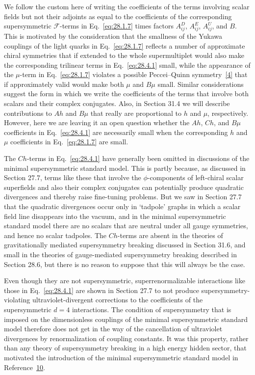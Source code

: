 We follow the custom here of writing the coefficients of the terms
involving scalar fields but not their adjoints as equal to the
coefficients of the corresponding supersymmetric \(\mathcal{F}\)-terms in
Eq.~\eqref{eq:28.1.7} times factors \(A_{ij}^{D}\), \(A_{ij}^{E}\),
\(A_{ij}^{U}\), and \(B\). This is motivated by the consideration that
the smallness of the Yukawa couplings of the light quarks in
Eq.~\eqref{eq:28.1.7} reflects a number of approximate chiral symmetries
that if extended to the whole supermultiplet would also make the
corresponding trilinear terms in Eq.~\eqref{eq:28.4.1} small, while the
appearance of the \(\mu\)-term in Eq.~\eqref{eq:28.1.7} violates a
possible Peccei--Quinn symmetry~\hyperref[ch28-ref-4]{[4]} that if
approximately valid would make both \(\mu\) and \(B\mu\) small. Similar
considerations suggest the form in which we write the coefficients of the
terms that involve both scalars and their complex conjugates. Also, in
Section 31.4 we will describe contributions to \(Ah\) and \(B\mu\) that
really are proportional to \(h\) and \(\mu\), respectively. However, here
we are leaving it an open question whether the \(Ah\), \(Ch\), and
\(B\mu\) coefficients in Eq.~\eqref{eq:28.4.1} are necessarily small
when the corresponding \(h\) and \(\mu\) coefficients in
Eq.~\eqref{eq:28.1.7} are small.

The \(Ch\)-terms in Eq.~\eqref{eq:28.4.1} have generally been omitted in
discussions of the minimal supersymmetric standard model. This is partly
because, as discussed in Section 27.7, terms like these that involve the
\(\phi\)-components of left-chiral scalar superfields and also their
complex conjugates can potentially produce quadratic divergences and
thereby raise fine-tuning problems. But we saw in Section 27.7 that the
quadratic divergences occur only in `tadpole' graphs in which a scalar
field line disappears into the vacuum, and in the minimal supersymmetric
standard model there are no scalars that are neutral under all gauge
symmetries, and hence no scalar tadpoles. The \(Ch\)-terms are absent in
the theories of gravitationally mediated supersymmetry breaking discussed
in Section 31.6, and small in the theories of gauge-mediated supersymmetry
breaking described in Section 28.6, but there is no reason to suppose that
this will always be the case.

Even though they are not supersymmetric, superrenormalizable interactions
like those in Eq.~\eqref{eq:28.4.1} are shown in Section 27.7 to not
produce supersymmetry-violating ultraviolet-divergent corrections to the
coefficients of the supersymmetric \(d=4\) interactions. The condition of
supersymmetry that is imposed on the dimensionless couplings of the
minimal supersymmetric standard model therefore does not get in the way
of the cancellation of ultraviolet divergences by renormalization of
coupling constants. It was this property, rather than any theory of
supersymmetry breaking in a high energy hidden sector, that motivated the
introduction of the minimal supersymmetric standard model in
Reference~\hyperref[ch28-ref-10]{10}.

